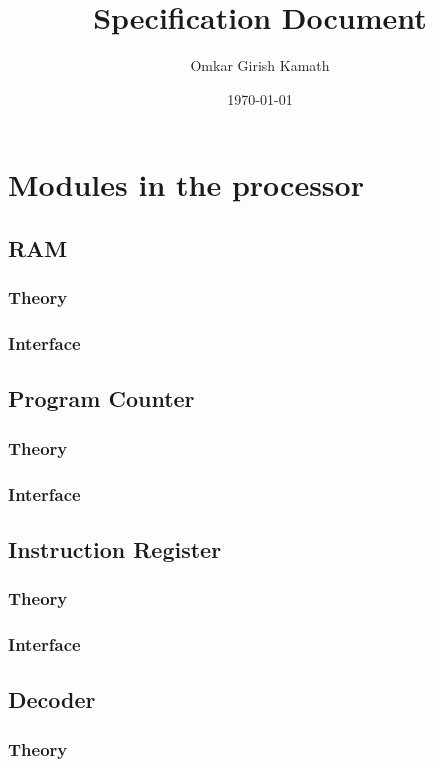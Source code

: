 \documentclass[11pt]{article}
\author{Omkar Girish Kamath}
\date{\today}
\title{Specification Document}
\begin{document}
\maketitle
\tableofcontents

\section{Modules in the processor}
\label{sec:org63b3496}
\subsection{RAM}
\label{sec:orgdd31987}
\subsubsection{Theory}
\label{sec:org5d72706}
\subsubsection{Interface}
\label{sec:org1e7aa70}
\subsection{Program Counter}
\label{sec:org7f2359d}
\subsubsection{Theory}
\label{sec:org0eea12d}
\subsubsection{Interface}
\label{sec:org22d4c7d}
\subsection{Instruction Register}
\label{sec:orge37fe41}
\subsubsection{Theory}
\label{sec:org591980c}
\subsubsection{Interface}
\label{sec:orgf270393}
\subsection{Decoder}
\label{sec:org72fcece}
\subsubsection{Theory}
\label{sec:orgb1bd94f}
\end{document}
